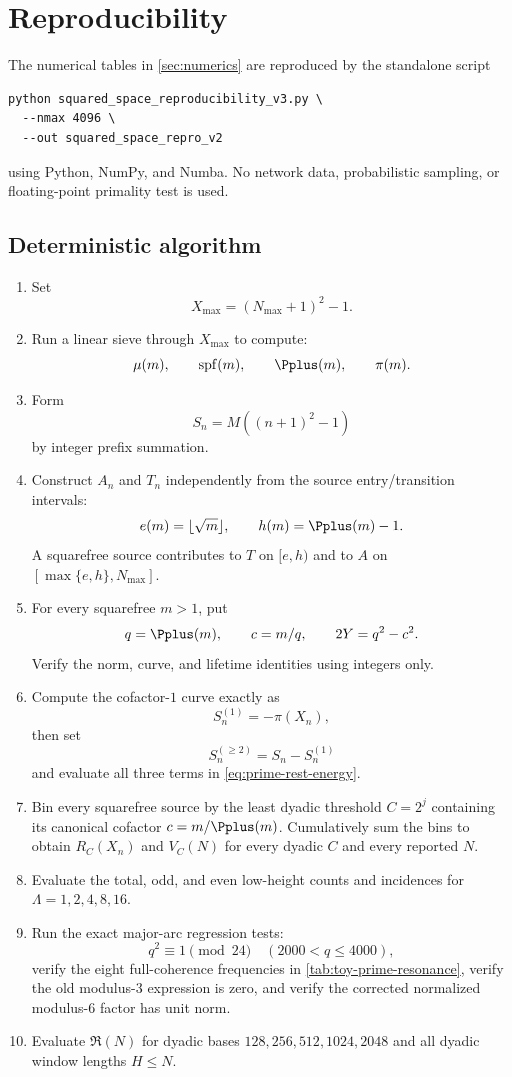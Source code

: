 \section{Reproducibility}
\label{app:reproducibility}

The numerical tables in \cref{sec:numerics} are reproduced by the standalone script
\begin{verbatim}
python squared_space_reproducibility_v3.py \
  --nmax 4096 \
  --out squared_space_repro_v2
\end{verbatim}
using Python, NumPy, and Numba.  No network data, probabilistic sampling, or floating-point primality test is used.

\subsection{Deterministic algorithm}

\begin{enumerate}[leftmargin=1.7em,itemsep=0.3em]
\item Set
\[
 X_{\max}=(N_{\max}+1)^2-1.
\]
\item Run a linear sieve through $X_{\max}$ to compute:
\[
 \mu(m),\qquad
 \operatorname{spf}(m),\qquad
 \Pplus(m),\qquad
 \pi(m).
\]
\item Form
\[
 S_n=M((n+1)^2-1)
\]
by integer prefix summation.
\item Construct $A_n$ and $T_n$ independently from the source entry/transition intervals:
\[
 e(m)=\lfloor\sqrt m\rfloor,
 \qquad
 h(m)=\Pplus(m)-1.
\]
A squarefree source contributes to $T$ on $[e,h)$ and to $A$ on $[\max\{e,h\},N_{\max}]$.
\item For every squarefree $m>1$, put
\[
 q=\Pplus(m),
 \qquad
 c=m/q,
 \qquad
 2Y=q^2-c^2.
\]
Verify the norm, curve, and lifetime identities using integers only.
\item Compute the cofactor-$1$ curve exactly as
\[
 S_n^{(1)}=-\pi(X_n),
\]
then set
\[
 S_n^{(\ge2)}=S_n-S_n^{(1)}
\]
and evaluate all three terms in \cref{eq:prime-rest-energy}.
\item Bin every squarefree source by the least dyadic threshold $C=2^j$ containing its canonical cofactor $c=m/\Pplus(m)$.  Cumulatively sum the bins to obtain $R_C(X_n)$ and $V_C(N)$ for every dyadic $C$ and every reported $N$.
\item Evaluate the total, odd, and even low-height counts and incidences for $\Lambda=1,2,4,8,16$.
\item Run the exact major-arc regression tests:
\[
 q^2\equiv1\pmod{24}\quad(2000<q\le4000),
\]
verify the eight full-coherence frequencies in \cref{tab:toy-prime-resonance}, verify the old modulus-$3$ expression is zero, and verify the corrected normalized modulus-$6$ factor has unit norm.
\item Evaluate $\mathfrak R(N)$ for dyadic bases $128,256,512,1024,2048$ and all dyadic window lengths $H\le N$.
\end{enumerate}

